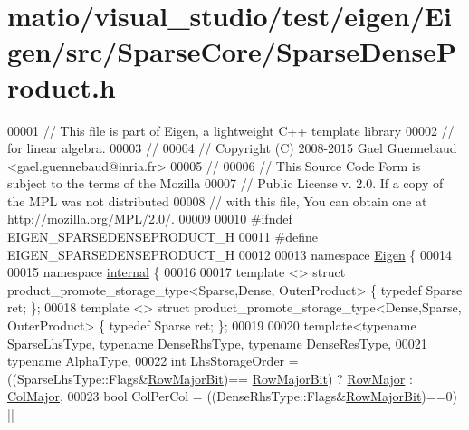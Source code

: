\hypertarget{matio_2visual__studio_2test_2eigen_2_eigen_2src_2_sparse_core_2_sparse_dense_product_8h_source}{}\section{matio/visual\+\_\+studio/test/eigen/\+Eigen/src/\+Sparse\+Core/\+Sparse\+Dense\+Product.h}
\label{matio_2visual__studio_2test_2eigen_2_eigen_2src_2_sparse_core_2_sparse_dense_product_8h_source}

\begin{DoxyCode}
00001 \textcolor{comment}{// This file is part of Eigen, a lightweight C++ template library}
00002 \textcolor{comment}{// for linear algebra.}
00003 \textcolor{comment}{//}
00004 \textcolor{comment}{// Copyright (C) 2008-2015 Gael Guennebaud <gael.guennebaud@inria.fr>}
00005 \textcolor{comment}{//}
00006 \textcolor{comment}{// This Source Code Form is subject to the terms of the Mozilla}
00007 \textcolor{comment}{// Public License v. 2.0. If a copy of the MPL was not distributed}
00008 \textcolor{comment}{// with this file, You can obtain one at http://mozilla.org/MPL/2.0/.}
00009 
00010 \textcolor{preprocessor}{#ifndef EIGEN\_SPARSEDENSEPRODUCT\_H}
00011 \textcolor{preprocessor}{#define EIGEN\_SPARSEDENSEPRODUCT\_H}
00012 
00013 \textcolor{keyword}{namespace }\hyperlink{namespace_eigen}{Eigen} \{ 
00014 
00015 \textcolor{keyword}{namespace }\hyperlink{namespaceinternal}{internal} \{
00016 
00017 \textcolor{keyword}{template} <> \textcolor{keyword}{struct }product\_promote\_storage\_type<Sparse,Dense, OuterProduct> \{ \textcolor{keyword}{typedef} Sparse ret; \};
00018 \textcolor{keyword}{template} <> \textcolor{keyword}{struct }product\_promote\_storage\_type<Dense,Sparse, OuterProduct> \{ \textcolor{keyword}{typedef} Sparse ret; \};
00019 
00020 \textcolor{keyword}{template}<\textcolor{keyword}{typename} SparseLhsType, \textcolor{keyword}{typename} DenseRhsType, \textcolor{keyword}{typename} DenseResType,
00021          \textcolor{keyword}{typename} AlphaType,
00022          \textcolor{keywordtype}{int} LhsStorageOrder = ((SparseLhsType::Flags&\hyperlink{group__flags_gae4f56c2a60bbe4bd2e44c5b19cbe8762}{RowMajorBit})==
      \hyperlink{group__flags_gae4f56c2a60bbe4bd2e44c5b19cbe8762}{RowMajorBit}) ? \hyperlink{group__enums_ggaacded1a18ae58b0f554751f6cdf9eb13acfcde9cd8677c5f7caf6bd603666aae3}{RowMajor} : \hyperlink{group__enums_ggaacded1a18ae58b0f554751f6cdf9eb13a0cbd4bdd0abcfc0224c5fcb5e4f6669a}{ColMajor},
00023          \textcolor{keywordtype}{bool} ColPerCol = ((DenseRhsType::Flags&\hyperlink{group__flags_gae4f56c2a60bbe4bd2e44c5b19cbe8762}{RowMajorBit})==0) || 

\end{DoxyCode}
